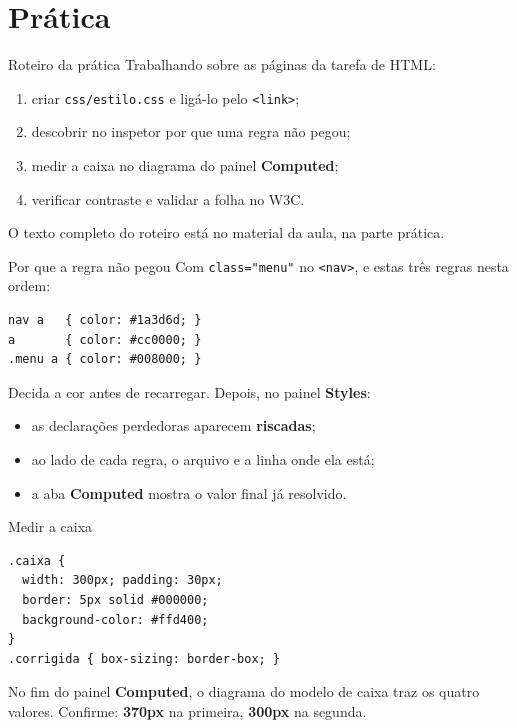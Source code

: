 \documentclass{beamer}
\begin{document}
\section{Prática}

\begin{frame}{Roteiro da prática}
	Trabalhando sobre as páginas da tarefa de HTML:

	\begin{enumerate}
		\item criar \texttt{css/estilo.css} e ligá-lo pelo \texttt{<link>};
		\item descobrir no inspetor por que uma regra não pegou;
		\item medir a caixa no diagrama do painel \textbf{Computed};
		\item verificar contraste e validar a folha no W3C.
	\end{enumerate}

	\vspace{0.4cm}
	O texto completo do roteiro está no material da aula, na parte prática.
\end{frame}

\begin{frame}[fragile]{Por que a regra não pegou}
	Com \texttt{class="menu"} no \texttt{<nav>}, e estas três regras nesta ordem:

	\begin{verbatim}
nav a   { color: #1a3d6d; }
a       { color: #cc0000; }
.menu a { color: #008000; }
  \end{verbatim}

	\vspace{0.2cm}
	Decida a cor antes de recarregar. Depois, no painel \textbf{Styles}:

	\begin{itemize}
		\item as declarações perdedoras aparecem \textbf{riscadas};
		\item ao lado de cada regra, o arquivo e a linha onde ela está;
		\item a aba \textbf{Computed} mostra o valor final já resolvido.
	\end{itemize}
\end{frame}

\begin{frame}[fragile]{Medir a caixa}
	\begin{verbatim}
.caixa {
  width: 300px; padding: 30px;
  border: 5px solid #000000;
  background-color: #ffd400;
}
.corrigida { box-sizing: border-box; }
  \end{verbatim}

	\vspace{0.2cm}
	No fim do painel \textbf{Computed}, o diagrama do modelo de caixa traz os
	quatro valores. Confirme: \textbf{370px} na primeira, \textbf{300px} na
	segunda.
\end{frame}
\end{document}
